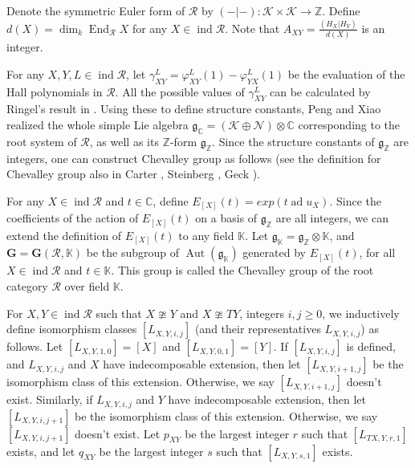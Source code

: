\documentclass[12pt]{amsart}
\begin{document}
Denote the symmetric Euler form of $\mathcal{R}$ by $(-|-):\mathcal{K}\times \mathcal{K} \rightarrow \mathbb{Z}$. 
Define $d(X)=\operatorname{dim}_k \operatorname{End}_{\mathcal{R}}X$ for any $X\in \operatorname{ind}\mathcal{R}$.
Note that $A_{XY}=\frac{(H_X|H_Y)}{d(X)}$ is an integer.

For any $X,Y,L\in \operatorname{ind}\mathcal{R}$, let $\gamma_{XY}^L=\varphi_{XY}^L(1)-\varphi_{YX}^L(1)$ be the evaluation of the Hall polynomials in $\mathcal{R}$.
All the possible values of $\gamma_{XY}^L$ can be calculated by Ringel's result in \cite{RINGEL1990137}.
Using these to define structure constants, Peng and Xiao \cite{1997ROOT} realized the whole simple Lie algebra $\mathfrak{g}_{\mathbb{C}}=(\mathcal{K}\oplus \mathcal{N})\otimes \mathbb{C}$ corresponding to the root system of $\mathcal{R}$, as well as its $\mathbb{Z}$-form $\mathfrak{g}_{\mathbb{Z}}$.
Since the structure constants of $\mathfrak{g}_{\mathbb{Z}}$ are integers, one can construct Chevalley group as follows (see the definition for Chevalley group also in Carter \cite{carter}, Steinberg \cite{Steinberg}, Geck \cite{geck}).

For any $X\in \operatorname{ind}\mathcal{R}$ and $t\in \mathbb{C}$, define $E_{[X]}(t)=exp(t \operatorname{ad}u_X)$.
Since the coefficients of the action of $E_{[X]}(t)$ on a basis of $\mathfrak{g}_{\mathbb{Z}}$ are all integers, we can extend the definition of $E_{[X]}(t)$ to any field $\mathbb{K}$.
Let $\mathfrak{g}_{\mathbb{K}}=\mathfrak{g}_{\mathbb{Z}}\otimes \mathbb{K}$, and $\mathbf{G}=\mathbf{G}(\mathcal{R},\mathbb{K})$ be the subgroup of $\operatorname{Aut}(\mathfrak{g}_{\mathbb{K}})$ generated by $E_{[X]}(t)$, for all $X\in \operatorname{ind}\mathcal{R}$ and $t\in \mathbb{K}$.
This group is called the Chevalley group of the root category $\mathcal{R}$ over field $\mathbb{K}$.


For $X,Y\in \operatorname{ind}\mathcal{R}$ such that $X\ncong Y$ and $X \ncong TY$, integers $i,j\geq 0$, we inductively define isomorphism classes $[L_{X,Y,i,j}]$ (and their representatives $L_{X,Y,i,j}$) as follows.
Let $[L_{X,Y,1,0}]=[X]$ and $[L_{X,Y,0,1}]=[Y]$. 
If $[L_{X,Y,i,j}]$ is defined, and $L_{X,Y,i,j}$ and $X$ have indecomposable extension, then let $[L_{X,Y,i+1,j}]$ be the isomorphism class of this extension. 
Otherwise, we say $[L_{X,Y,i+1,j}]$ doesn't exist.
Similarly, if  $L_{X,Y,i,j}$ and $Y$ have indecomposable extension, then let $[L_{X,Y,i,j+1}]$ be the isomorphism class of this extension.
Otherwise, we say $[L_{X,Y,i,j+1}]$ doesn't exist.
Let $p_{XY}$ be the largest integer $r$ such that $[L_{TX,Y,r,1}]$ exists, and let $q_{XY}$ be the largest integer $s$ such that $[L_{X,Y,s,1}]$ exists.
\end{document}
